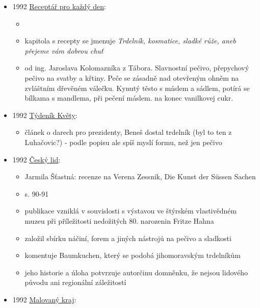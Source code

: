 \begin{itemize}
  \begin{itemize}
  \tightlist
  \item
    není online, 
  \item
    s. 164: trdelníky. béleše. amolety. lívance, koblihy. V kostickém
    jídelníčku meziválečného období patřilo k vzácným pokrmům maso
  \end{itemize}
\item
  1992
  \href{https://ceskadigitalniknihovna.cz/uuid/uuid:3cd82b40-62fb-11e3-9ea2-5ef3fc9ae867}{Receptář
  pro každý den}:

  \begin{itemize}
  \tightlist
  \item
  \item
    kapitola s recepty se jmenuje \emph{Trdelník, kosmatice, sladké
    růže, aneb přejeme vám dobrou chuť}
  \item
     od ing. Jaroslava Kolomazníka z Tábora. Slavnostní
    pečivo, přepychový pečivo na svatby a křtiny. Peče se zásadně nad
    otevřeným ohněm na zvláštním dřevěném válečku. Kynutý těsto s máslem
    a sádlem, potírá se bílkama s mandlema, při pečení máslem. na konec
    vanilkovej cukr.
  \end{itemize}
\item
  1992
  \href{https://ndk.cz/uuid/uuid:2a7057e0-8b35-11e3-8031-001018b5eb5c}{Týdeník
  Květy}:

  \begin{itemize}
  \tightlist
  \item
    článek o darech pro prezidenty, Beneš dostal trdelník (byl to ten z
    Luhačovic?) - podle popisu ale spíš myslí formu, než jen pečivo
  \end{itemize}
\item
  1992
  \href{https://www.digitalniknihovna.cz/mzk/uuid/uuid:d67cff93-4611-11e1-1586-001143e3f55c}{Český
  lid}:

  \begin{itemize}
  \tightlist
  \item
    Jarmila Šťastná: recenze na Verena Zessnik, Die Kunst der Süssen
    Sachen
  \item
    s. 90-91
  \item
    publikace vzniklá v souvislosti s výstavou ve štýrském vlastivědném
    muzeu při příležitosti nedožitých 80. narozenin Fritze Hahna
  \item
    založil sbírku náčiní, forem a jiných nástrojů na pečivo a sladkosti
  \item
    komentuje Baumkuchen, který se podobá jihomoravským trdelníkům
  \item
    jeho historie a úloha potvrzuje autorčinu domněnku, že nejsou
    lidového původu ani regionální záležitostí
  \end{itemize}
\item
  1992
  \href{https://ndk.cz/uuid/uuid:82983460-0236-11e4-9806-005056825209}{Malovaný
  kraj}:


\end{itemize}
